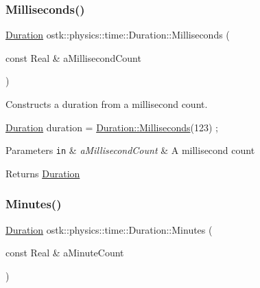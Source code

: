 \subsubsection{\texorpdfstring{Milliseconds()}{Milliseconds()}}
{\footnotesize\ttfamily \hyperlink{classostk_1_1physics_1_1time_1_1_duration}{Duration} ostk\+::physics\+::time\+::\+Duration\+::\+Milliseconds (\begin{DoxyParamCaption}\item[{const Real \&}]{a\+Millisecond\+Count }\end{DoxyParamCaption})\hspace{0.3cm}{\ttfamily [static]}}



Constructs a duration from a millisecond count. 


\begin{DoxyCode}
\hyperlink{classostk_1_1physics_1_1time_1_1_duration_a6ba3a020742ca6e3bf0b1970dd039c07}{Duration} duration = \hyperlink{classostk_1_1physics_1_1time_1_1_duration_a0712e9c93f9be6ca4d837998fda90e7a}{Duration::Milliseconds}(123) ;
\end{DoxyCode}



\begin{DoxyParams}[1]{Parameters}
\mbox{\tt in}  & {\em a\+Millisecond\+Count} & A millisecond count \\
\hline
\end{DoxyParams}
\begin{DoxyReturn}{Returns}
\hyperlink{classostk_1_1physics_1_1time_1_1_duration}{Duration} 
\end{DoxyReturn}
\mbox{\label{classostk_1_1physics_1_1time_1_1_duration_a1cd2884c6bb89071780c7dffcba9b49f}} 
\subsubsection{\texorpdfstring{Minutes()}{Minutes()}}
{\footnotesize\ttfamily \hyperlink{classostk_1_1physics_1_1time_1_1_duration}{Duration} ostk\+::physics\+::time\+::\+Duration\+::\+Minutes (\begin{DoxyParamCaption}\item[{const Real \&}]{a\+Minute\+Count }\end{DoxyParamCaption})\hspace{0.3cm}{\ttfamily [static]}}



